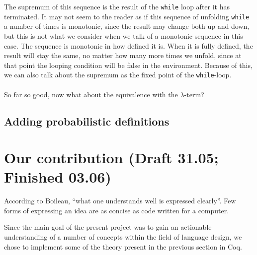 \documentclass[11pt, leqno, titlepage]{article}
\theoremstyle{definition}
\begin{document}
The supremum of this sequence is the result of the \texttt{while} loop after it has
terminated. It may not seem to the reader as if this sequence of unfolding
\texttt{while} a number of times is monotonic, since the result may change both up
and down, but this is not what we consider when we talk of a monotonic sequence in
this case. The sequence is monotonic in how defined it is. When it is fully defined,
the result will stay the same, no matter how many more times we unfold, since at that
point the looping condition will be false in the environment. Because of this, we can
also talk about the supremum as the fixed point of the \texttt{while}-loop.\\
\\
So far so good, now what about the equivalence with the $\lambda$-term?


\subsection{Adding probabilistic definitions}\label{sec:probab}


\section{Our contribution (Draft 31.05; Finished 03.06)}\label{sec:contrib}

According to Boileau, ``what one understands well is expressed clearly''. Few forms
of expressing an idea are as concise as code written for a computer.

Since the main goal of the present project was to gain an actionable understanding of
a number of concepts within the field of language design, we chose to implement some
of the theory present in the previous section in Coq.
\end{document}
